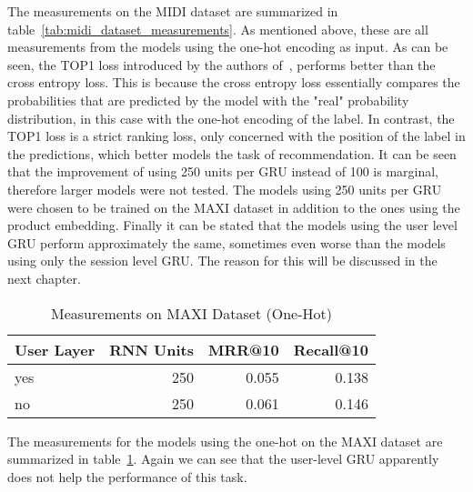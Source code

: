 The measurements on the MIDI dataset are summarized in table~\ref{tab:midi_dataset_measurements}.
As mentioned above, these are all measurements from the models using the one-hot encoding as input.
As can be seen, the TOP1 loss introduced by the authors of~\cite{gru4rec}, performs better than the cross entropy loss.
This is because the cross entropy loss essentially compares the probabilities that are predicted by the model with the "real" probability distribution, in this case with the one-hot encoding of the label.
In contrast, the TOP1 loss is a strict ranking loss, only concerned with the position of the label in the predictions, which better models the task of recommendation.
It can be seen that the improvement of using 250 units per GRU instead of 100 is marginal, therefore larger models were not tested.
The models using 250 units per GRU were chosen to be trained on the MAXI dataset in addition to the ones using the product embedding.
Finally it can be stated that the models using the user level GRU perform approximately the same, sometimes even worse than the models using only the session level GRU.
The reason for this will be discussed in the next chapter.
\begin{table}[t]
    \centering
    \begin{tabular}{lrrr}\toprule
        \textbf{User Layer} & \textbf{RNN Units} & \textbf{MRR@10} & \textbf{Recall@10} \\ \midrule
        yes & 250 & 0.055 & 0.138 \\ 
        no & 250 & 0.061 & 0.146 \\ \bottomrule
    \end{tabular}
    \caption{Measurements on MAXI Dataset (One-Hot)}
    \label{tab:maxi_dataset_measurements_one_hot}
\end{table}
The measurements for the models using the one-hot on the MAXI dataset are summarized in table~\ref{tab:maxi_dataset_measurements_one_hot}.
Again we can see that the user-level GRU apparently does not help the performance of this task.

